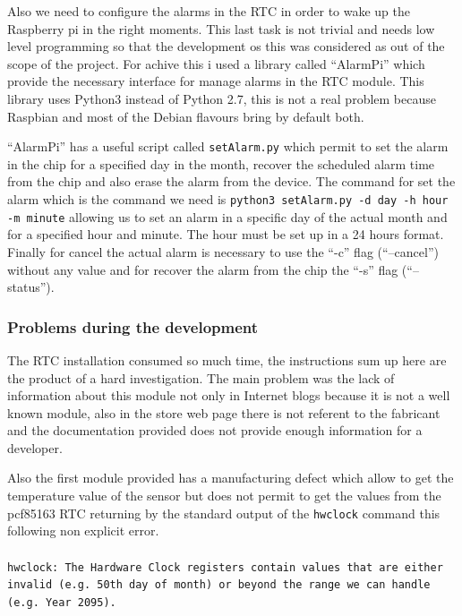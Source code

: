 			Also we need to configure the alarms in the RTC in order to wake up the Raspberry pi in the right moments. This last task is not trivial and needs low level programming so that the development os this was considered as out of the scope of the project. For achive this i used a library called ``AlarmPi'' which provide the necessary interface for manage alarms in the RTC module. This library uses Python3 instead of Python 2.7, this is not a real problem because Raspbian and most of the Debian flavours bring by default both.

			``AlarmPi'' has a useful script called \texttt{setAlarm.py} which permit to set the alarm in the chip for a specified day in the month, recover the scheduled alarm time from the chip and also erase the alarm from the device. The command for set the alarm which is the command we need is \texttt{python3 setAlarm.py -d day -h hour -m minute} allowing us to set an alarm in a specific day of the actual month and for a specified hour and minute. The hour must be set up in a 24 hours format. Finally for cancel the actual alarm is necessary to use the ``-c'' flag (``--cancel'') without any value and for recover the alarm from the chip the ``-s'' flag (``--status'').

			\subsubsection{Problems during the development} %
			The RTC installation consumed so much time, the instructions sum up here are the product of a hard investigation. The main problem was the lack of information about this module not only in Internet blogs because it is not a well known module, also in the store web page there is not referent to the fabricant and the documentation provided does not provide enough information for a developer.

			Also the first module provided has a manufacturing defect which allow to get the temperature value of the sensor but does not permit to get the values from the pcf85163 RTC returning by the standard output of the \texttt{hwclock} command this following non explicit error.\\\\

			\texttt{hwclock: The Hardware Clock registers contain values that are either invalid (e.g. 50th day of month) or beyond the range we can handle (e.g. Year 2095).}\\\\

